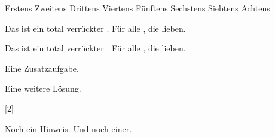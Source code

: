\documentclass[a4paper]{scrartcl}
\begin{document}
    \begin{aufgabe}[subtitle=Eine Kreuzchenaufgabe,symbol=\symHaken]
        \begin{mcumgebung} %
            \choice Erstens
            \choice Zweitens
            \choice Drittens
            \choice[\mcrichtig] Viertens
            \choice Fünftens
            \choice[\mcrichtig] Sechstens
            \choice Siebtens
            \choice[\mcrichtig] Achtens
        \end{mcumgebung}
        \begin{loesung}
            \mcloesung
        \end{loesung}
        \begin{erwartungen}
        \end{erwartungen}
    \end{aufgabe}

    \begin{aufgabe}[symbol=\symBleistift,subtitle={Lückentext}]
        Das ist ein total verrückter . Für alle , die  lieben.
        \begin{loesung}
            Das ist ein total verrückter . Für alle , die  lieben.
        \end{loesung}
        \begin{erwartungen}
        \end{erwartungen}
    \end{aufgabe}

    \begin{aufgabe*}
        Eine Zusatzaufgabe.
        \begin{loesung*}
            Eine weitere Lösung.
        \end{loesung*}
        \begin{erwartungen}
            [2]
        \end{erwartungen}
        \begin{bearbeitungshinweis}
            Noch ein Hinweis. Und noch einer.
        \end{bearbeitungshinweis}
    \end{aufgabe*}
\end{document}
